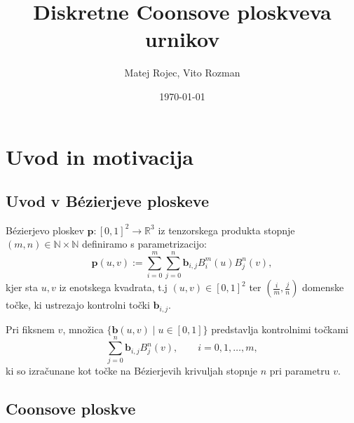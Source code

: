 \documentclass[a4paper,12pt]{article}
\begin{document}
\newcommand{\N}{\mathbb{N}}
\newcommand{\R}{\mathbb{R}}


\title{Diskretne Coonsove ploskveva urnikov}
\author{Matej Rojec, Vito Rozman}
\date{\today}

\maketitle

\tableofcontents

\section{Uvod in motivacija}

\subsection{Uvod v Bézierjeve ploskeve}
Bézierjevo ploskev $\mathbf{p} : [0,1]^2 \rightarrow \R^3$ iz tenzorskega produkta stopnje $(m, n) \in \N \times \N$  
definiramo s parametrizacijo:
$$\mathbf{p}(u,v) := \sum_{i=0}^m \sum_{j=0}^n \mathbf{b}_{i,j} B_i^m(u)B_j^n(v),$$
kjer sta $u,v$ iz enotskega kvadrata, t.j $(u,v) \in [0,1]^2$ ter $(\frac{i}{m}, \frac{j}{n})$
domenske točke, ki ustrezajo kontrolni točki $\mathbf{b}_{i,j}$.

Pri fiksnem $v$, množica $\{\mathbf{b} (u,v) \mid u \in [0,1]  \}$ predstavlja 
kontrolnimi točkami
$$\sum_{j=0}^n \mathbf{b}_{i,j} B_j^n(v), \qquad i=0,1,\ldots,m,$$
ki so izračunane kot točke na Bézierjevih krivuljah stopnje $n$ pri parametru $v$.


\subsection{Coonsove ploskve}
\end{document}
